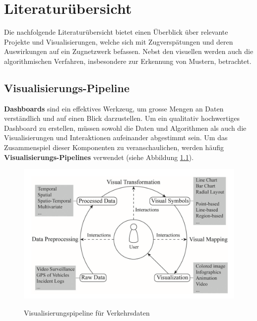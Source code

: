 \chapter{Literaturübersicht}
\label{kap:literaturübersicht}
Die nachfolgende Literaturübersicht bietet einen Überblick über relevante Projekte und Visualisierungen, welche sich mit Zugverspätungen und deren Auswirkungen auf ein Zugnetzwerk befassen. Nebst den visuellen werden auch die algorithmischen Verfahren, insbesondere zur Erkennung von Mustern, betrachtet.

\section{Visualisierungs-Pipeline}
\textbf{Dashboards} sind ein effektives Werkzeug, um grosse Mengen an Daten verständlich und auf einen Blick darzustellen. Um ein qualitativ hochwertiges Dashboard zu erstellen, müssen sowohl die Daten und Algorithmen als auch die Visualisierungen und Interaktionen aufeinander abgestimmt sein. Um das Zusammenspiel dieser Komponenten zu veranschaulichen, werden häufig \textbf{Visualisierungs-Pipelines} verwendet (siehe Abbildung \ref{fig_pipeline_traffic_visualization}).

\begin{figure}[H]
    \caption{Visualisierungspipeline für Verkehrsdaten \parencite[S. 2971]{survey_traffic_data_visualization_2015}}
    \includegraphics[width=.8\linewidth]{content/00_assets/traffic_visualization_pipeline.png}
    \label{fig_pipeline_traffic_visualization}
\end{figure}

